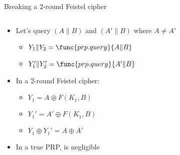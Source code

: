 \documentclass[aspectratio=169, lualatex, handout]{beamer}
\begin{document}
\begin{frame}{Breaking a 2-round Feistel cipher}
	\begin{columns}[c]
		\begin{column}{0.4\textwidth}
			\begin{itemize}
				\item Let's query $(A \| B)$ and $(A' \| B)$ where $A \neq A'$
				      \begin{itemize}
					      \item $Y_1 \| Y_2 = \func{prp.query}{A \| B}$
					      \item $Y_1' \| Y_2' = \func{prp.query}{A' \| B}$
				      \end{itemize}
				\item In a 2-round Feistel cipher:
				      \begin{itemize}
					      \item $Y_1 = A \oplus F(K_1, B)$
					      \item $Y_1' = A' \oplus F(K_1, B)$
					      \item $Y_1 \oplus Y_1' = A \oplus A'$
				      \end{itemize}
				\item In a true PRP,  is negligible
			\end{itemize}
		\end{column}
		\begin{column}{0.6\textwidth}
			\begin{center}
			\end{center}
		\end{column}
	\end{columns}
\end{frame}
\end{document}
